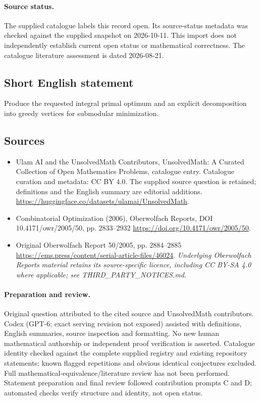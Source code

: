 \documentclass[11pt]{article}
\begin{document}
\paragraph{Source status.}
The supplied catalogue labels this record open. Its source-status metadata was checked against the supplied snapshot on 2026-10-11. This import does not independently establish current open status or mathematical correctness. The catalogue literature assessment is dated 2026-08-21.
\subsection{Short English statement}
Produce the requested integral primal optimum and an explicit decomposition into greedy vertices for submodular minimization.
\subsection{Sources}
\begin{itemize}
\item[\hypertarget{source:statement:1}{S1}] Ulam AI and the UnsolvedMath Contributors, UnsolvedMath: A Curated Collection of Open Mathematics Problems, catalogue entry. Catalogue curation and metadata: CC BY 4.0. The supplied source question is retained; definitions and the English summary are editorial additions.
\url{https://huggingface.co/datasets/ulamai/UnsolvedMath}.
\item[\hypertarget{source:statement:2}{S2}] Combinatorial Optimization (2006), Oberwolfach Reports, DOI 10.4171/owr/2005/50, pp. 2833--2932
\url{https://doi.org/10.4171/owr/2005/50}.
\item[\hypertarget{source:statement:3}{S3}] Original Oberwolfach Report 50/2005, pp. 2884--2885
\url{https://ems.press/content/serial-article-files/46024}.
\textit{Underlying Oberwolfach Reports material retains its source-specific licence, including CC BY-SA 4.0 where applicable; see THIRD\_PARTY\_NOTICES.md.}
\end{itemize}
\paragraph{Preparation and review.}
Original question attributed to the cited source and UnsolvedMath contributors. Codex (GPT-6; exact serving revision not exposed) assisted with definitions, English summaries, source inspection and formatting. No new human mathematical authorship or independent proof verification is asserted. Catalogue identity checked against the complete supplied registry and existing repository statements; known flagged repetitions and obvious identical conjectures excluded. Full mathematical-equivalence/literature review has not been performed. Statement preparation and final review followed contribution prompts C and D; automated checks verify structure and identity, not open status.
\label{end:statement}
\end{document}
